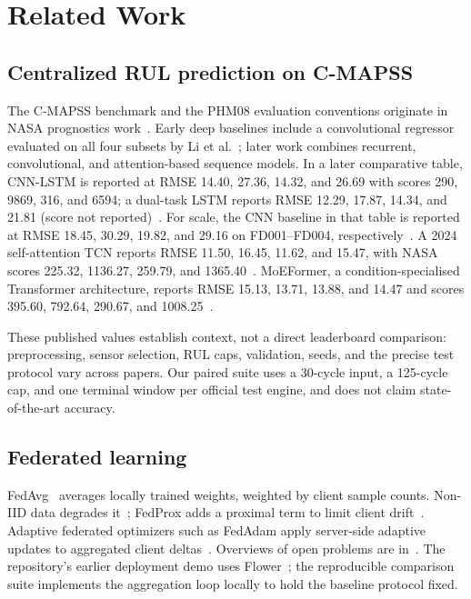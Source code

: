 \section{Related Work}
\label{sec:related}
\subsection{Centralized RUL prediction on C-MAPSS}
The C-MAPSS benchmark and the PHM08 evaluation conventions originate in NASA prognostics work~\cite{saxena2008damage,saxena2008metrics}. Early deep baselines include a convolutional regressor evaluated on all four subsets by Li et al.~\cite{li2018cnn}; later work combines recurrent, convolutional, and attention-based sequence models. In a later comparative table, CNN-LSTM is reported at RMSE 14.40, 27.36, 14.32, and 26.69 with scores 290, 9869, 316, and 6594; a dual-task LSTM reports RMSE 12.29, 17.87, 14.34, and 21.81 (score not reported)~\cite{liu2025moeformer}. For scale, the CNN baseline in that table is reported at RMSE 18.45, 30.29, 19.82, and 29.16 on FD001--FD004, respectively~\cite{liu2025moeformer}. A 2024 self-attention TCN reports RMSE 11.50, 16.45, 11.62, and 15.47, with NASA scores 225.32, 1136.27, 259.79, and 1365.40~\cite{wang2024adamsamtcn}. MoEFormer, a condition-specialised Transformer architecture, reports RMSE 15.13, 13.71, 13.88, and 14.47 and scores 395.60, 792.64, 290.67, and 1008.25~\cite{liu2025moeformer}.

These published values establish context, not a direct leaderboard comparison: preprocessing, sensor selection, RUL caps, validation, seeds, and the precise test protocol vary across papers. Our paired suite uses a 30-cycle input, a 125-cycle cap, and one terminal window per official test engine, and does not claim state-of-the-art accuracy.

\subsection{Federated learning}
FedAvg~\cite{mcmahan2017fedavg} averages locally trained weights, weighted by client sample counts. Non-IID data degrades it~\cite{zhao2018noniid}; FedProx adds a proximal term to limit client drift~\cite{li2020fedprox}. Adaptive federated optimizers such as FedAdam apply server-side adaptive updates to aggregated client deltas~\cite{reddi2021adaptive}. Overviews of open problems are in~\cite{kairouz2021advances,li2020challenges}. The repository's earlier deployment demo uses Flower~\cite{beutel2020flower}; the reproducible comparison suite implements the aggregation loop locally to hold the baseline protocol fixed.

